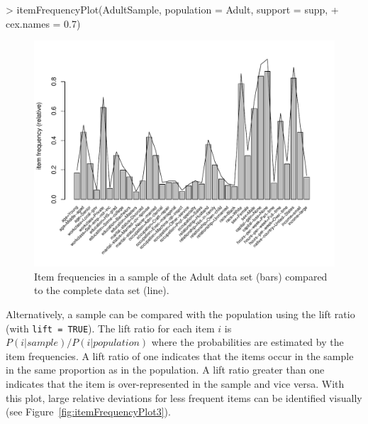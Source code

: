 \documentclass[10pt,a4paper]{article}
\newcommand{\code}[1]{\mbox{\texttt{#1}}}
\begin{document}
\begin{Schunk}
\begin{Sinput}
> itemFrequencyPlot(AdultSample, population = Adult, support = supp, 
+     cex.names = 0.7)
\end{Sinput}
\end{Schunk}
\begin{figure}
\centering
\includegraphics{arules-033}
\caption{Item frequencies in a sample of the Adult data set (bars) compared to 
the complete data set (line).}
\label{fig:itemFrequencyPlot2}
\end{figure}

Alternatively,
a sample can be compared with the population using the lift ratio 
(with \code{lift = TRUE}).
The lift ratio for each item $i$ is 
$P(i | \mathit{sample}) / P(i | \mathit{population})$ where the 
probabilities are estimated by the item frequencies.
A lift ratio of one indicates that the items occur in the sample
in the same proportion as in the population. A lift ratio greater than one 
indicates that the item is over-represented in the sample and vice versa.
With this plot, 
large relative deviations for less frequent items can be identified
visually
(see Figure~\ref{fig:itemFrequencyPlot3}). 
\end{document}
